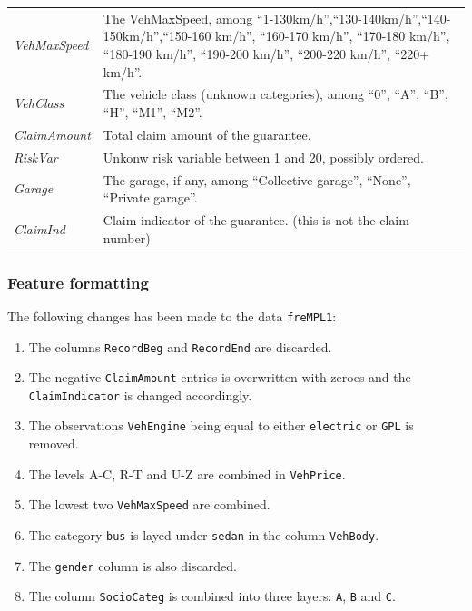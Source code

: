 \documentclass[
]{article}
\providecommand{\tightlist}{%
  \setlength{\itemsep}{0pt}\setlength{\parskip}{0pt}}
\begin{document}
\begin{longtable}[]{@{}
  >{\raggedright\arraybackslash}p{}
  >{\raggedright\arraybackslash}p{}@{}}
\emph{VehMaxSpeed} & The VehMaxSpeed, among
``1-130km/h'',``130-140km/h'',``140-150km/h'',``150-160 km/h'',
``160-170 km/h'', ``170-180 km/h'', ``180-190 km/h'', ``190-200 km/h'',
``200-220 km/h'', ``220+ km/h''. \\
\emph{VehClass} & The vehicle class (unknown categories), among ``0'',
``A'', ``B'', ``H'', ``M1'', ``M2''. \\
\emph{ClaimAmount} & Total claim amount of the guarantee. \\
\emph{RiskVar} & Unkonw risk variable between 1 and 20, possibly
ordered. \\
\emph{Garage} & The garage, if any, among ``Collective garage'',
``None'', ``Private garage''. \\
\emph{ClaimInd} & Claim indicator of the guarantee. (this is not the
claim number) \\
\bottomrule()
\end{longtable}

\hypertarget{feature-formatting}{%
\subsubsection{Feature formatting}\label{feature-formatting}}

The following changes has been made to the data \texttt{freMPL1}:

\begin{enumerate}
\def\labelenumi{\arabic{enumi}.}
\tightlist
\item
  The columns \texttt{RecordBeg} and \texttt{RecordEnd} are discarded.
\item
  The negative \texttt{ClaimAmount} entries is overwritten with zeroes
  and the \texttt{ClaimIndicator} is changed accordingly.
\item
  The observations \texttt{VehEngine} being equal to either
  \texttt{electric} or \texttt{GPL} is removed.
\item
  The levels A-C, R-T and U-Z are combined in \texttt{VehPrice}.
\item
  The lowest two \texttt{VehMaxSpeed} are combined.
\item
  The category \texttt{bus} is layed under \texttt{sedan} in the column
  \texttt{VehBody}.
\item
  The \texttt{gender} column is also discarded.
\item
  The column \texttt{SocioCateg} is combined into three layers:
  \texttt{A}, \texttt{B} and \texttt{C}.
\end{enumerate}
\end{document}
